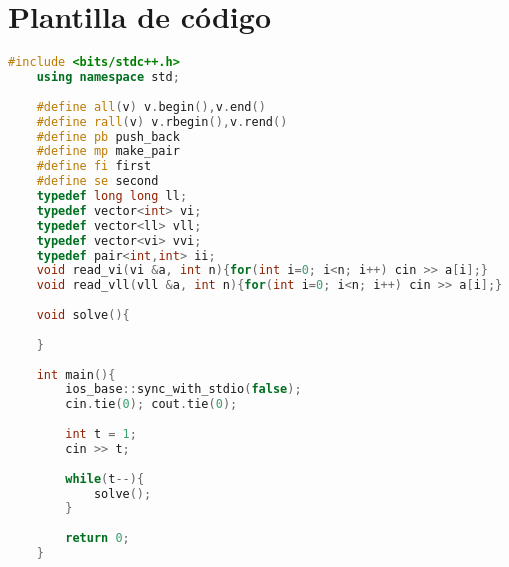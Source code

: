 
\section*{Plantilla de código}

\begin{lstlisting}[language=C++]
	#include <bits/stdc++.h>
	using namespace std; 
	
	#define all(v) v.begin(),v.end()
	#define rall(v) v.rbegin(),v.rend()
	#define pb push_back
	#define mp make_pair
	#define fi first
	#define se second
	typedef long long ll; 
	typedef vector<int> vi; 
	typedef vector<ll> vll; 
	typedef vector<vi> vvi; 
	typedef pair<int,int> ii; 
	void read_vi(vi &a, int n){for(int i=0; i<n; i++) cin >> a[i];}
	void read_vll(vll &a, int n){for(int i=0; i<n; i++) cin >> a[i];}
	
	void solve(){
		
	}
	
	int main(){
		ios_base::sync_with_stdio(false);
		cin.tie(0); cout.tie(0); 
		
		int t = 1; 
		cin >> t; 
		
		while(t--){
			solve(); 
		}
		
		return 0; 
	}
\end{lstlisting}
